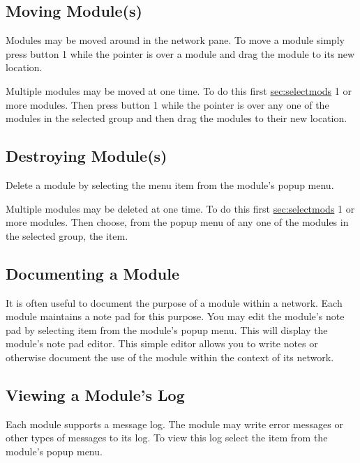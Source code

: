 \subsection{Moving Module(s)}
\label{sec:movemod}

Modules may be moved around in the network pane.  To move a module simply
press button 1 while the pointer is over a module and drag the module to
its new location.

Multiple modules may be moved at one time.  To do this first
\hyperref{select}{select (see Section~}{)}{sec:selectmods} 1 or more
modules. Then press button 1 while the pointer is over any one of the
modules in the selected group and then drag the modules to their new location.


\subsection{Destroying Module(s)}
\label{sec:destroymod}

Delete a module by selecting the  menu item from the
module's popup menu.

Multiple modules may be deleted at one time.  To do this first
\hyperref{select}{select (see Section~}{)}{sec:selectmods} 1 or more
modules. Then choose, from the popup menu of any one of the modules in the
selected group, the  item.


\subsection{Documenting a Module}
\label{sec:docmodule}

It is often useful to document the purpose of a module within a network.
Each module maintains a note pad for this purpose.  You may edit the
module's note pad by selecting  item from the module's
popup menu.  This will display the module's note pad editor.  This simple
editor allows you to write notes or otherwise document the use of the
module within the context of its network.

\subsection{Viewing a Module's Log}
\label{sec:viewmodslog}

Each module supports a message log.  The module may write error messages or
other types of messages to its log.  To view this log select the
 item from the module's popup menu.

